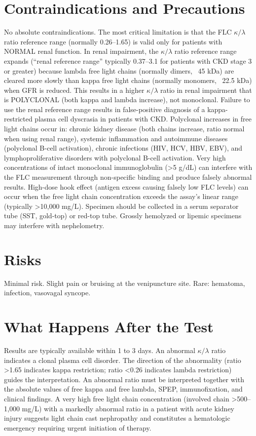 \section*{Contraindications and Precautions}
No absolute contraindications. The most critical limitation is that the FLC $\kappa/\lambda$ ratio reference range (normally 0.26--1.65) is valid only for patients with NORMAL renal function. In renal impairment, the $\kappa/\lambda$ ratio reference range expands (``renal reference range'' typically 0.37--3.1 for patients with CKD stage 3 or greater) because lambda free light chains (normally dimers, ~45 kDa) are cleared more slowly than kappa free light chains (normally monomers, ~22.5 kDa) when GFR is reduced. This results in a higher $\kappa/\lambda$ ratio in renal impairment that is POLYCLONAL (both kappa and lambda increase), not monoclonal. Failure to use the renal reference range results in false-positive diagnosis of a kappa-restricted plasma cell dyscrasia in patients with CKD. Polyclonal increases in free light chains occur in: chronic kidney disease (both chains increase, ratio normal when using renal range), systemic inflammation and autoimmune diseases (polyclonal B-cell activation), chronic infections (HIV, HCV, HBV, EBV), and lymphoproliferative disorders with polyclonal B-cell activation. Very high concentrations of intact monoclonal immunoglobulin (>5 g/dL) can interfere with the FLC measurement through non-specific binding and produce falsely abnormal results. High-dose hook effect (antigen excess causing falsely low FLC levels) can occur when the free light chain concentration exceeds the assay's linear range (typically >10,000 mg/L). Specimen should be collected in a serum separator tube (SST, gold-top) or red-top tube. Grossly hemolyzed or lipemic specimens may interfere with nephelometry.

\section*{Risks}
Minimal risk. Slight pain or bruising at the venipuncture site. Rare: hematoma, infection, vasovagal syncope.

\section*{What Happens After the Test}
Results are typically available within 1 to 3 days. An abnormal $\kappa/\lambda$ ratio indicates a clonal plasma cell disorder. The direction of the abnormality (ratio >1.65 indicates kappa restriction; ratio <0.26 indicates lambda restriction) guides the interpretation. An abnormal ratio must be interpreted together with the absolute values of free kappa and free lambda, SPEP, immunofixation, and clinical findings. A very high free light chain concentration (involved chain >500--1,000 mg/L) with a markedly abnormal ratio in a patient with acute kidney injury suggests light chain cast nephropathy and constitutes a hematologic emergency requiring urgent initiation of therapy.

